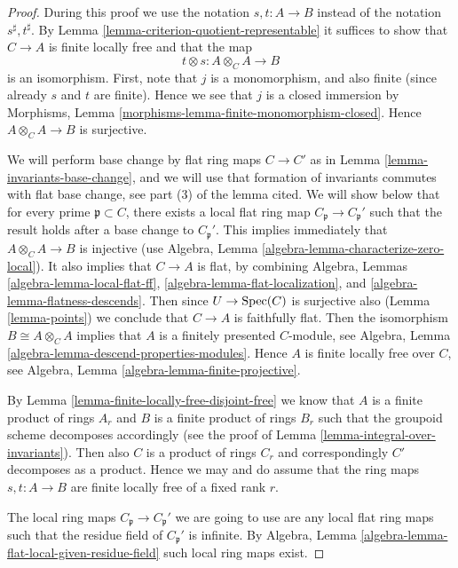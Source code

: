 \begin{proof}
During this proof we use the notation $s, t : A \to B$
instead of the notation $s^\sharp, t^\sharp$.
By Lemma \ref{lemma-criterion-quotient-representable}
it suffices to show that $C \to A$ is finite locally free
and that the map
$$
t \otimes s : A \otimes_C A \longrightarrow B
$$
is an isomorphism. First, note that $j$ is a monomorphism, and
also finite (since already $s$ and $t$ are finite). Hence we see
that $j$ is a closed immersion by
Morphisms, Lemma \ref{morphisms-lemma-finite-monomorphism-closed}.
Hence $A \otimes_C A \to B$ is surjective.

\medskip\noindent
We will perform base change by flat ring maps $C \to C'$ as in
Lemma \ref{lemma-invariants-base-change}, and we will use that
formation of invariants commutes with flat base change, see
part (3) of the lemma cited.
We will show below that for every prime $\mathfrak p \subset C$, there exists
a local flat ring map $C_{\mathfrak p} \to C_{\mathfrak p}'$
such that the result holds after a base change to $C_{\mathfrak p}'$.
This implies immediately
that $A \otimes_C A \to B$ is injective (use
Algebra, Lemma \ref{algebra-lemma-characterize-zero-local}).
It also implies that $C \to A$ is flat, by combining
Algebra, Lemmas \ref{algebra-lemma-local-flat-ff},
\ref{algebra-lemma-flat-localization}, and
\ref{algebra-lemma-flatness-descends}. Then since $U \to \mathop{\rm Spec}(C)$
is surjective also (Lemma \ref{lemma-points}) we conclude that $C \to A$
is faithfully flat. Then the isomorphism $B \cong A \otimes_C A$
implies that $A$ is a finitely presented $C$-module, see
Algebra, Lemma \ref{algebra-lemma-descend-properties-modules}.
Hence $A$ is finite locally free over $C$, see
Algebra, Lemma \ref{algebra-lemma-finite-projective}.

\medskip\noindent
By Lemma \ref{lemma-finite-locally-free-disjoint-free}
we know that $A$ is a finite
product of rings $A_r$ and $B$ is a finite product of rings $B_r$
such that the groupoid scheme decomposes accordingly (see the proof
of Lemma \ref{lemma-integral-over-invariants}).
Then also $C$ is a product of rings $C_r$ and
correspondingly $C'$ decomposes as a product. Hence we may and do
assume that the ring maps $s, t : A \to B$ are finite
locally free of a fixed rank $r$.

\medskip\noindent
The local ring maps $C_{\mathfrak p} \to C_{\mathfrak p}'$ we are going
to use are any local flat ring maps such that the residue field of
$C_{\mathfrak p}'$ is infinite.
By Algebra, Lemma \ref{algebra-lemma-flat-local-given-residue-field}
such local ring maps exist.


\end{proof}
